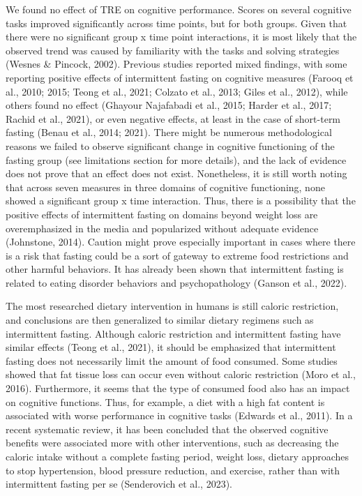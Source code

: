 \documentclass[authordate, empirical]{jote-new-article}
\begin{document}
We found no effect of TRE on cognitive performance. Scores on several cognitive tasks improved significantly across time points, but for both groups. Given that there were no significant group x time point interactions, it is most likely that the observed trend was caused by familiarity with the tasks and solving strategies (Wesnes \& Pincock, 2002). Previous studies reported mixed findings, with some reporting positive effects of intermittent fasting on cognitive measures (Farooq et al., 2010; 2015; Teong et al., 2021; Colzato et al., 2013; Giles et al., 2012), while others found no effect (Ghayour Najafabadi et al., 2015; Harder et al., 2017; Rachid et al., 2021), or even negative effects, at least in the case of short-term fasting (Benau et al., 2014; 2021). There might be numerous methodological reasons we failed to observe significant change in cognitive functioning of the fasting group (see limitations section for more details), and the lack of evidence does not prove that an effect does not exist. Nonetheless, it is still worth noting that across seven measures in three domains of cognitive functioning, none showed a significant group x time interaction. Thus, there is a possibility that the positive effects of intermittent fasting on domains beyond weight loss are overemphasized in the media and popularized without adequate evidence (Johnstone, 2014). Caution might prove especially important in cases where there is a risk that fasting could be a sort of gateway to extreme food restrictions and other harmful behaviors. It has already been shown that intermittent fasting is related to eating disorder behaviors and psychopathology (Ganson et al., 2022).



The most researched dietary intervention in humans is still caloric restriction, and conclusions are then generalized to similar dietary regimens such as intermittent fasting. Although caloric restriction and intermittent fasting have similar effects (Teong et al., 2021), it should be emphasized that intermittent fasting does not necessarily limit the amount of food consumed. Some studies showed that fat tissue loss can occur even without caloric restriction (Moro et al., 2016). Furthermore, it seems that the type of consumed food also has an impact on cognitive functions. Thus, for example, a diet with a high fat content is associated with worse performance in cognitive tasks (Edwards et al., 2011). In a recent systematic review, it has been concluded that the observed cognitive benefits were associated more with other interventions, such as decreasing the caloric intake without a complete fasting period, weight loss, dietary approaches to stop hypertension, blood pressure reduction, and exercise, rather than with intermittent fasting per se (Senderovich et al., 2023).
\end{document}
